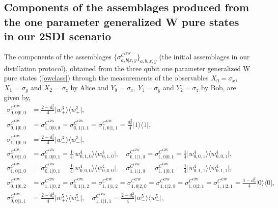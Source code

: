 \documentclass[reprint,superscriptaddress,nofootinbib,amsmath,amssymb,aps,pra,longbibliography]{revtex4-1}
\begin{document}
\begin{widetext}
\section{Components of the assemblages produced from the one parameter generalized W pure states in our 2SDI scenario}\label{OW2Sassemblage}
The components of the assemblages $\{\sigma_{a,b|x,y}^{C^{\text{GW}}}\}_{a,b,x,y}$ (the initial assemblages in our distillation protocol), obtained from the three qubit one parameter generalized W pure states (\ref{owclass}) through the measurements of the observables  $X_0= \sigma_x$, $X_1=\sigma_y$ and $X_2=\sigma_z$ by Alice and $Y_0= \sigma_x$, $Y_1=\sigma_y$ and $Y_2=\sigma_z$ by Bob, are given by,
\begin{align}
	\sigma_{0,0|0,0}^{C^{\text{GW}}} &= \frac{2-d_0^2}{4}\Big| w_{+}^3 \Big\rangle \Big\langle w_{+}^3 \Big|, \nonumber \\
	\sigma_{0,1|0,0}^{C^{\text{GW}}} &=\sigma_{1,0|0,0}^{C^{\text{GW}}} = \sigma_{0,1|1,1}^{C^{\text{GW}}} = \sigma_{1,0|1,1}^{C^{\text{GW}}} = \frac{d_0^2}{4}\Big| 1 \Big\rangle \Big\langle 1 \Big|, \nonumber \\
	\sigma_{1,1|0,0}^{C^{\text{GW}}} & = \frac{2-d_0^2}{4}\Big| w_{-}^3 \Big\rangle \Big\langle w_{-}^3 \Big|, \nonumber \\
	  \sigma_{0,0|1,0}^{C^{\text{GW}}} &=  \sigma_{0,0|0,1}^{C^{\text{GW}}} = \frac{1}{4}\Big| w_{0,1,0}^4 \Big\rangle \Big\langle w_{0,1,0}^4 \Big|, \quad \sigma_{0,1|1,0}^{C^{\text{GW}}} = \sigma_{1,0|0,1} ^{C^{\text{GW}}}  = \frac{1}{4}\Big| w_{0,0,1}^4 \Big\rangle \Big\langle w_{0,0,1}^4 \Big|, \, \nonumber \\
	\sigma_{1,0|1,0}^{C^{\text{GW}}} &= \sigma_{0,1|0,1}^{C^{\text{GW}}} = \frac{1}{4}\Big| w_{0,0,0}^4 \Big\rangle \Big\langle w_{0,0,0}^4 \Big|, \quad  \sigma_{1,1|1,0}^{C^{\text{GW}}} = \sigma_{1,1|0,1}^{C^{\text{GW}}} = \frac{1}{4} \Big| w_{0,1,1}^4 \Big\rangle \Big\langle w_{0,1,1}^4 \Big|,\nonumber \\ 
	\sigma_{0,1|0,2}^{C^{\text{GW}}}&=\sigma_{1,1|0,2}^{C^{\text{GW}}}=\sigma_{0,1|1,2}^{C^{\text{GW}}} = \sigma_{1,1|1,2}^{C^{\text{GW}}} = \sigma_{1,0|2,0}^{C^{\text{GW}}} = \sigma_{1,1|2,0}^{C^{\text{GW}}} = \sigma_{1,0|2,1}^{C^{\text{GW}}}=\sigma_{1,1|2,1}^{C^{\text{GW}}}= \frac{1-d_0^2}{4} \Big| 0 \Big\rangle \Big\langle 0 \Big|, \nonumber \\
\sigma_{0,0|1,1}^{C^{\text{GW}}} &=  \frac{2-d_0^2}{4} \Big| w_{+}^5 \Big\rangle \Big\langle w_{+}^5 \Big| , \quad 
     \sigma_{1,1|1,1}^{C^{\text{GW}}} =  \frac{2-d_0^2}{4} \Big| w_{-}^5 \Big\rangle \Big\langle w_{-}^5 \Big| , \nonumber \\

\end{align}
\end{widetext}
\end{document}

